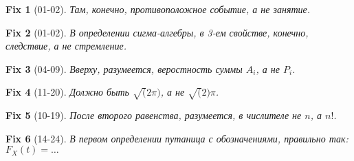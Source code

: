 \documentclass{article}
\newtheorem*{fix}{Fix}
\begin{document}
  \begin{fix}[01-02]
    Там, конечно, противоположное событие, а не занятие.
  \end{fix}

  \begin{fix}[01-02]
    В определении сигма-алгебры, в 3-ем свойстве, конечно, следствие, а не стремление.
  \end{fix}

  \begin{fix}[04-09]
    Вверху, разумеется, веростность суммы \(A_i\), а не \(P_i\).
  \end{fix}

  \begin{fix}[11-20]
    Должно быть \(\sqrt(2\pi)\), а не \(\sqrt(2)\pi\).
  \end{fix}

  \begin{fix}[10-19]
    После второго равенства, разумеется, в числителе не \(n\), а \(n!\).
  \end{fix}

  \begin{fix}[14-24]
    В первом определении путаница с обозначениями, правильно так: \(F_X(t) = \ldots\)
  \end{fix}
\end{document}
